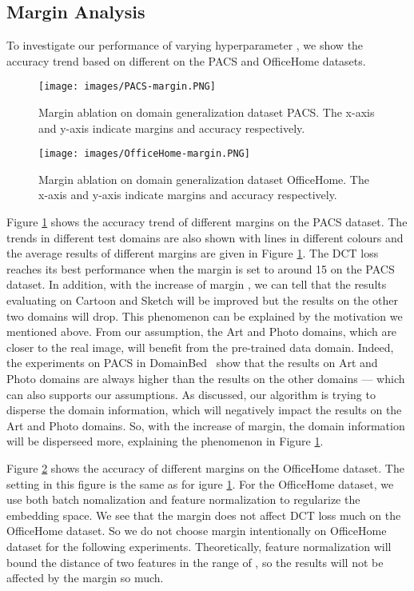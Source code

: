 \documentclass[a4paper,fleqn]{cas-dc}
\begin{document}
\subsection{Margin Analysis}
To investigate our performance of varying hyperparameter , we show the accuracy trend based on different  on the PACS and OfficeHome datasets. \par
\begin{figure}[ht]
\centering 
\texttt{[image: images/PACS-margin.PNG]}
\caption{Margin ablation on domain generalization dataset PACS. The x-axis and y-axis indicate margins and accuracy respectively.} 
\label{Fig3} 
\end{figure}
\begin{figure}[ht]
\centering 
\texttt{[image: images/OfficeHome-margin.PNG]} 
\caption{Margin ablation on domain generalization dataset OfficeHome. The x-axis and y-axis indicate margins and accuracy respectively.} 
\label{FigOHmargin} 
\end{figure}
Figure \ref{Fig3} shows the accuracy trend of different margins on the PACS dataset. The trends in different test domains are also shown with lines in different colours and the average results of different margins are given in Figure \ref{Fig3}. The DCT loss reaches its best performance when the margin is set to around 15 on the PACS dataset. In addition, with the increase of margin , we can tell that the results evaluating on Cartoon and Sketch will be improved but the results on the other two domains will drop. This phenomenon can be explained by the motivation we mentioned above. From our assumption,  the Art and Photo domains, which are closer to the real image, will benefit from the pre-trained data domain. Indeed, the experiments on PACS in DomainBed~\cite{domainbed} show that the results on Art and Photo domains are always higher than the results on the other domains --- which can also supports our assumptions. As discussed, our algorithm is trying to disperse the domain information, which will negatively impact the results on the Art and Photo domains. So, with the increase of margin, the domain information will be disperseed more, explaining the phenomenon in Figure \ref{Fig3}.\par
Figure \ref{FigOHmargin} shows the accuracy of different margins on the OfficeHome dataset. The setting in this figure is the same as for igure \ref{Fig3}. For the OfficeHome dataset, we use both batch nomalization and feature normalization to regularize the embedding space.  We see that the margin does not affect DCT loss much on the OfficeHome dataset. So we do not choose margin intentionally on OfficeHome dataset for the following experiments. Theoretically, feature normalization will bound the distance of two features in the range of , so the results will not be affected by the margin so much.  
\end{document}
